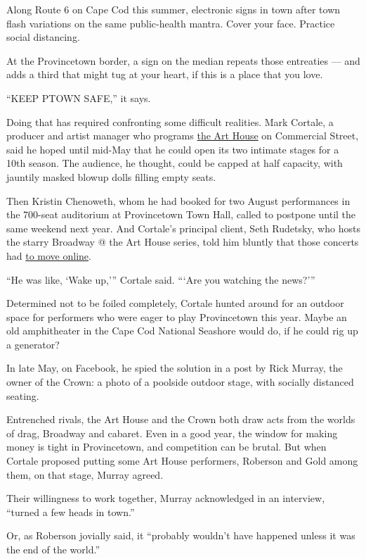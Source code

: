 Along Route 6 on Cape Cod this summer, electronic signs in town after
town flash variations on the same public-health mantra. Cover your face.
Practice social distancing.

At the Provincetown border, a sign on the median repeats those
entreaties --- and adds a third that might tug at your heart, if this is
a place that you love.

``KEEP PTOWN SAFE,'' it says.

Doing that has required confronting some difficult realities. Mark
Cortale, a producer and artist manager who programs
\href{https://www.ptownarthouse.com}{the Art House} on Commercial
Street, said he hoped until mid-May that he could open its two intimate
stages for a 10th season. The audience, he thought, could be capped at
half capacity, with jauntily masked blowup dolls filling empty seats.

Then Kristin Chenoweth, whom he had booked for two August performances
in the 700-seat auditorium at Provincetown Town Hall, called to postpone
until the same weekend next year. And Cortale's principal client, Seth
Rudetsky, who hosts the starry Broadway @ the Art House series, told him
bluntly that those concerts had
\href{https://thesethconcertseries.com}{to move online}.

``He was like, `Wake up,''' Cortale said. ```Are you watching the
news?'''

Determined not to be foiled completely, Cortale hunted around for an
outdoor space for performers who were eager to play Provincetown this
year. Maybe an old amphitheater in the Cape Cod National Seashore would
do, if he could rig up a generator?

In late May, on Facebook, he spied the solution in a post by Rick
Murray, the owner of the Crown: a photo of a poolside outdoor stage,
with socially distanced seating.

Entrenched rivals, the Art House and the Crown both draw acts from the
worlds of drag, Broadway and cabaret. Even in a good year, the window
for making money is tight in Provincetown, and competition can be
brutal. But when Cortale proposed putting some Art House performers,
Roberson and Gold among them, on that stage, Murray agreed.

Their willingness to work together, Murray acknowledged in an interview,
``turned a few heads in town.''

Or, as Roberson jovially said, it ``probably wouldn't have happened
unless it was the end of the world.''


